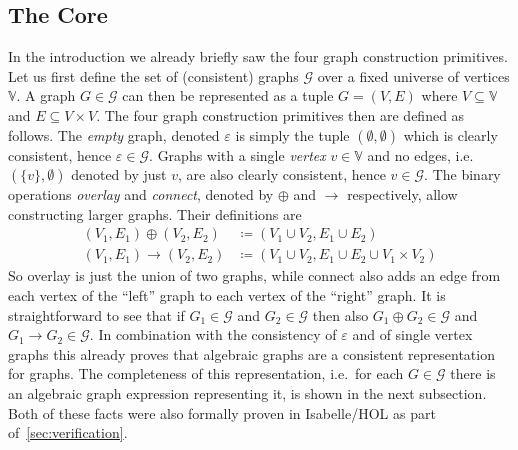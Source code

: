 \documentclass{article}
\renewcommand{\epsilon}{\varepsilon}
\newcommand{\eps}{\epsilon}
\newcommand{\overlay}{\oplus}
\newcommand{\connect}{\rightarrow}
\begin{document}
\subsection{The Core}\label{sec:core}
In the introduction we already briefly saw the four graph construction
primitives. Let us first define the set of (consistent) graphs $\mathcal{G}$
over a fixed universe of vertices $\mathbb{V}$. A graph $G \in \mathcal{G}$ can
then be represented as a tuple $G=(V,E)$ where $V \subseteq \mathbb{V}$ and $E
\subseteq V \times V$.
The four graph construction primitives
then are defined as follows. The \textit{empty} graph, denoted $\eps$ is
simply the tuple $(\emptyset, \emptyset)$ which is clearly consistent, hence
$\eps \in \mathcal{G}$. Graphs with a single \textit{vertex} $v \in
\mathbb{V}$ and no edges, i.e.\ $(\{v\}, \emptyset)$  denoted by just $v$, are also
clearly consistent, hence $v \in \mathcal{G}$. The binary operations
\textit{overlay} and \textit{connect}, denoted by $\overlay$ and $\connect$
respectively, allow constructing larger graphs. Their definitions are
\begin{align*}
  (V_1, E_1) \overlay (V_2, E_2) &\coloneqq (V_1 \cup V_2, E_1 \cup E_2)\\
  (V_1, E_1) \connect (V_2, E_2) &\coloneqq (V_1 \cup V_2, E_1 \cup E_2 \cup V_1 \times V_2)
\end{align*}
So overlay is just the union of two graphs, while connect also adds an edge from
each vertex of the ``left'' graph to each vertex of the ``right'' graph. It is
straightforward to see that if $G_1 \in \mathcal{G}$ and $G_2 \in \mathcal{G}$
then also $G_1 \overlay G_2 \in \mathcal{G}$ and $G_1 \connect G_2 \in
\mathcal{G}$. In combination with the consistency of $\eps$ and of single vertex
graphs this already proves that algebraic graphs are a consistent
representation for graphs. The completeness of this representation, i.e.\ for
each $G \in \mathcal{G}$ there is an algebraic graph expression representing it,
is shown in the next subsection. Both of these facts were also formally proven in
Isabelle/HOL as part of~\autoref{sec:verification}.
\end{document}
